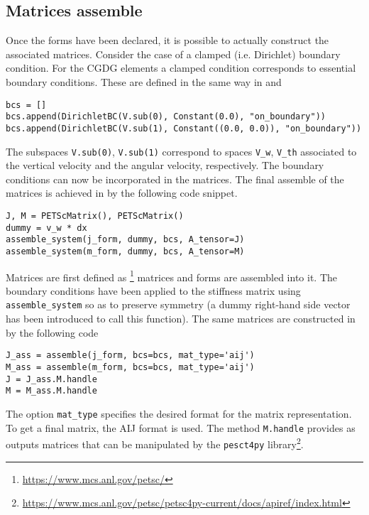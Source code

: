 \subsection*{Matrices assemble}
Once the forms have been declared, it is possible to actually construct the associated matrices. Consider the case of a clamped (i.e. Dirichlet) boundary condition. For the CGDG elements a clamped condition corresponds to essential boundary conditions. These are defined in the same way in \fenics and \firedrake
\begin{tcolorbox}[title = Dirichlet boundary conditions (\fenics \& \firedrake), coltitle=white, breakable, size=fbox, boxrule=1pt, pad at break*=1mm, enlarge top by=0.25em, enlarge bottom by=0.5em]
\begin{Verbatim}[tabsize=4]
bcs = []
bcs.append(DirichletBC(V.sub(0), Constant(0.0), "on_boundary"))
bcs.append(DirichletBC(V.sub(1), Constant((0.0, 0.0)), "on_boundary"))
\end{Verbatim}
\end{tcolorbox}
The subspaces \verb|V.sub(0)|, \verb|V.sub(1)| correspond to spaces \verb|V_w|, \verb|V_th| associated to the vertical velocity and the angular velocity, respectively. The boundary conditions can now be incorporated in the matrices. The final assemble of the matrices is achieved in \fenics by the following code snippet.
\begin{tcolorbox}[title = Matrices assemble in  \fenics, coltitle=black, breakable, size=fbox, boxrule=1pt, pad at break*=1mm, colframe=red, enlarge top by=0.25em, enlarge bottom by=0.5em]
\begin{Verbatim}[tabsize=4]
J, M = PETScMatrix(), PETScMatrix()
dummy = v_w * dx
assemble_system(j_form, dummy, bcs, A_tensor=J)
assemble_system(m_form, dummy, bcs, A_tensor=M)
\end{Verbatim}
\end{tcolorbox}
Matrices are first defined as {}\footnote{\url{https://www.mcs.anl.gov/petsc/}} matrices and forms are assembled into it. The boundary conditions have been applied to the stiffness matrix using \verb|assemble_system| so as to preserve symmetry (a dummy right-hand side vector has been introduced to call this function). The same matrices are constructed in \firedrake by the following code
\begin{tcolorbox}[title = Matrices assemble in  \firedrake, coltitle=black, breakable, size=fbox, boxrule=1pt, pad at break*=1mm, colframe=cyan, enlarge top by=0.25em, enlarge bottom by=0.5em]
\begin{Verbatim}[tabsize=4]
J_ass = assemble(j_form, bcs=bcs, mat_type='aij')
M_ass = assemble(m_form, bcs=bcs, mat_type='aij')
J = J_ass.M.handle
M = M_ass.M.handle
\end{Verbatim}
\end{tcolorbox}
The option \verb|mat_type| specifies the desired format for the matrix representation. To get a final {} matrix, the AIJ format is used. The method \verb|M.handle| provides as outputs {} matrices that can be manipulated by the \verb|pesct4py| library\footnote{\url{https://www.mcs.anl.gov/petsc/petsc4py-current/docs/apiref/index.html}}. \\

